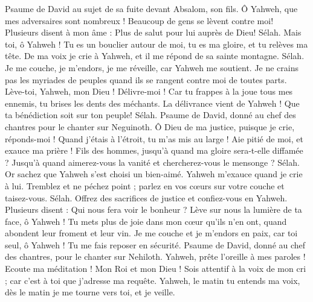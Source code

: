 \begin{multicols}{2}
\VerseOne{}Psaume de David au sujet de sa fuite devant Absalom, son fils.
Ô Yahweh, que mes adversaires sont nombreux ! Beaucoup de gens se lèvent contre moi!
Plusieurs disent à mon âme : Plus de salut pour lui auprès de Dieu! Sélah.
Mais toi, ô Yahweh ! Tu es un bouclier autour de moi, tu es ma gloire, et tu relèves ma tête.
De ma voix je crie à Yahweh, et il me répond de sa sainte montagne. Sélah.
Je me couche, je m'endors, je me réveille, car Yahweh me soutient.
Je ne crains pas les myriades de peuples quand ils se rangent contre moi de toutes parts.
Lève-toi, Yahweh, mon Dieu ! Délivre-moi ! Car tu frappes à la joue tous mes ennemis, tu brises les dents des méchants.
La délivrance vient de Yahweh ! Que ta bénédiction soit sur ton peuple! Sélah.
\VerseOne{}Psaume de David, donné au chef des chantres pour le chanter sur Neguinoth.
Ô Dieu de ma justice, puisque je crie, réponds-moi ! Quand j'étais à l'étroit, tu m'as mis au large ! Aie pitié de moi, et exauce ma prière !
Fils des hommes, jusqu'à quand ma gloire sera-t-elle diffamée ? Jusqu'à quand aimerez-vous la vanité et chercherez-vous le mensonge ? Sélah.
Or sachez que Yahweh s'est choisi un bien-aimé. Yahweh m'exauce quand je crie à lui.
Tremblez et ne péchez point ; parlez en vos cœurs sur votre couche et taisez-vous. Sélah.
Offrez des sacrifices de justice et confiez-vous en Yahweh.
Plusieurs disent : Qui nous fera voir le bonheur ? Lève sur nous la lumière de ta face, ô Yahweh !
Tu mets plus de joie dans mon cœur qu'ils n'en ont, quand abondent leur froment et leur vin.
Je me couche et je m'endors en paix, car toi seul, ô Yahweh ! Tu me fais reposer en sécurité.
\VerseOne{}Psaume de David, donné au chef des chantres, pour le chanter sur Nehiloth.
Yahweh, prête l'oreille à mes paroles ! Ecoute ma méditation !
Mon Roi et mon Dieu ! Sois attentif à la voix de mon cri ; car c'est à toi que j'adresse ma requête.
Yahweh, le matin tu entends ma voix, dès le matin je me tourne vers toi, et je veille.

\end{multicols}
